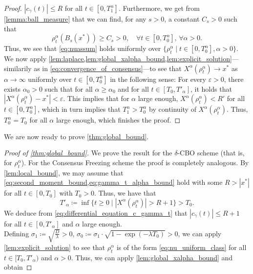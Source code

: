 \documentclass[reqno]{amsart}
\numberwithin{algorithm}{section}
\newcommand{\Xalpha}{{X^\alpha}}
\begin{document}
{\begin{proof}
    $|c_\gamma(t)| \leq R$ for all $t \in [0, T_1^\alpha]$. Furthermore, we get from \cref{lemma:ball_measure} that we can find, for any $s > 0$, a constant $C_s > 0$ such that
    \begin{equation*}
        \rho^\alpha_t(B_s(x^\ast)) \geq C_s > 0, \quad \forall t \in [0, T_0^\alpha],\, \forall \alpha > 0.
    \end{equation*}
    Thus, we see that \cref{eq:nuassum} holds uniformly over $\{\rho^\alpha_t \mid t \in [0, T^\alpha_0], \alpha > 0\}$. We now apply {\cref{lem:laplace,lem:global_xalpha_bound,lem:explicit_solution}}---similarily as in \cref{eq:convergence_of_consensus}---to see that $\Xalpha(\rho^\alpha_t) \to x^\ast$ as $\alpha \to \infty$ uniformly over $ t \in [0, T^\alpha_0]$ in the following sense: For every $\varepsilon > 0$, there exists $\alpha_0 > 0$ such that for all $\alpha \geq \alpha_0$ and for all $t \in [T_0, T'_\alpha]$, it holds that $|\Xalpha(\rho^\alpha_t) - x^\ast| < \varepsilon$. This implies that for $\alpha$ large enough, $\Xalpha(\rho^\alpha_t) < R'$ for all $t \in [0, T^\alpha_0]$, which in turn implies that $T_1^\alpha > T_0^\alpha$ by continuity of $\Xalpha(\rho^\alpha_t)$. Thus, $T_0^\alpha = T_0$ for all $\alpha$ large enough, which finishes the proof.
    \end{proof}
    We are now ready to prove \cref{thm:global_bound}.
    \begin{proof}[Proof of \cref{thm:global_bound}]
        We prove the result for the $\delta$-CBO scheme (that is, for $\rho^\alpha_t$). For the Consensus Freezing scheme the proof is completely analogous.
        By \cref{lem:local_bound}, we may assume that \cref{eq:second_moment_bound,eq:gamma_t_alpha_bound} hold with some $R > |x^\ast|$ for all $t \in [0, T_0]$ with $T_0 > 0$.
        Thus, we have that 
        \begin{equation}
            T'_\alpha \coloneqq \inf \{ t \geq 0 \mid |\Xalpha(\rho^\alpha_t)|  > R + 1 \} > T_0.
        \end{equation}
        We deduce from \cref{eq:differential_equation_c_gamma_t} that
        $|c_\gamma(t)| \leq R + 1$ for all $t \in [0, T'_\alpha]$ and $\alpha$ large enough. \\
        Defining $\sigma_1 \coloneqq \sqrt{\frac{D}{\lambda}} > 0$, $\sigma_0 \coloneqq \sigma_1 \cdot \sqrt{1 - \exp(-\lambda T_0)} > 0$, we can apply \cref{lem:explicit_solution} to see that $\rho_t^\alpha$ is of the form \eqref{eq:nu_uniform_class} for all $t \in [T_0, T'_\alpha)$ and $\alpha > 0$. Thus, we can apply \cref{lem:global_xalpha_bound} and obtain

\end{proof}}
\end{document}
